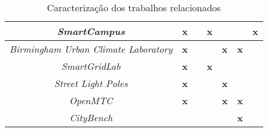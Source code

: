 \begin{table}[htb!]
{\begin{tabular}{|c|c|c|c|c|c|l|}
\textit{SmartCampus}                         & \textbf{x}                          & \textbf{}                      & \textbf{x}                          & \textbf{}                                & \textbf{}                     & \multicolumn{1}{c|}{\textbf{x}}                                       \\ \hline
\textit{Birmingham Urban Climate Laboratory} & \textbf{x}                          & \textbf{}                      & \textbf{}                           & \textbf{x}                               & \textbf{x}                    &                                                                       \\ \hline
\textit{SmartGridLab}                        & \textbf{x}                          & \textbf{}                      & \textbf{x}                          & \textbf{}                                & \textbf{}                     &                                                                       \\ \hline
\textit{Street Light Poles}                  & \textbf{x}                          & \multicolumn{1}{l|}{}          & \multicolumn{1}{l|}{}               & \textbf{x}                               & \multicolumn{1}{l|}{}         &                                                                       \\ \hline
\textit{OpenMTC}                             & \textbf{x}                          & \multicolumn{1}{l|}{}          & \multicolumn{1}{l|}{}               & \textbf{x}                               & \textbf{x}                    &                                                                       \\ \hline
\textit{CityBench}                           & \multicolumn{1}{l|}{}               & \multicolumn{1}{l|}{}          & \multicolumn{1}{l|}{}               & \multicolumn{1}{l|}{}                    & \textbf{x}                    &                                                                       \\ \hline
\end{tabular}
    }
    \caption{Caracterização dos trabalhos relacionados}
    \label{tab:trabalhos_relacionados}
\end{table}


